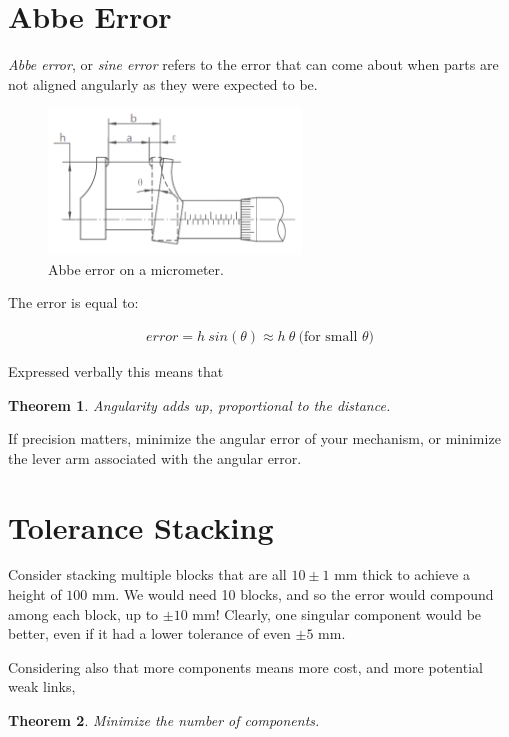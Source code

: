 \documentclass[10pt,letterpaper]{book}
\newtheorem{theorem}{Theorem}
\begin{document}
\section{Abbe Error}

\textit{Abbe error}, or \textit{sine error} refers to the error that can come about when parts are not aligned angularly as they were expected to be.

\begin{figure}[H]
	\includegraphics[width=0.6\textwidth]{imgs/abbe_error.png}
	\caption{Abbe error on a micrometer.}
\end{figure}

The error is equal to:

\begin{align}
	error = h \ sin(\theta) \approx h \ \theta \ \mbox{(for small $\theta$)}
\end{align}

Expressed verbally this means that

\begin{theorem} \label{theorem:abbe}
Angularity adds up, proportional to the distance.
\end{theorem}

If precision matters, minimize the angular error of your mechanism, or minimize the lever arm associated with the angular error.


\section{Tolerance Stacking}

Consider stacking multiple blocks that are all $10 \pm 1$ mm thick to achieve a height of $100$ mm. We would need 10 blocks, and so the error would compound among each block, up to $\pm 10$ mm! Clearly, one singular component would be better, even if it had a lower tolerance of even $\pm 5$ mm.

Considering also that more components means more cost, and more potential weak links,

\begin{theorem}
Minimize the number of components.
\end{theorem}
\end{document}
